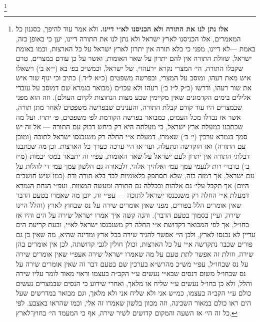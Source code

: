 \documentclass[12pt, openany]{book}
\newcommand{\footnotecomment}[1]{
	\renewcommand\thefootnote{}
	\footnote{\textsf{#1}}}
\newcommand{\commenta}[1]{\footnotecomment{#1}\hspace{0em}}
\begin{document}
\commenta{\textrm{\textbf{אלו נתן לנו את התורה ולא הכניסנו לא״י דיינו.}} ולא אמר עוד להיפך, כסגנון כל המאמרים, אלו הכניסנו לארץ ישראל ולא נתן לנו את התורה דיינו, יען כי באופן כזה, באמת —לא דיינו, מפני כי בלא תורה אין יתרון לארץ ישראל על כל הארצות, וכמו באומת ישראל, שזולת התורה אין להם יתרון על שאר האומות, ואשר על כן עודם במצרים, טרם שקבלו התורה, הי׳ המצרי נקרא ״רעהו״, של ישראל, וכמש״כ בפ׳ בא (י״א ב׳) וישאלו איש מאת רעהו, ומוסב על המצרי, ובפרשה משפטים (כ״א ל״ד.) כתיב וכי יגוף שור איש את שור רעהו, ודרשו (ב״ק ל״ז ב׳) רעהו ולא עכו״ם (מבואר בגמרא שם דמוסב על עובדי אלילים בימים הקדמונים שאין מקיימין שבע מצות הנחוצות לקיום העולם). וזה הוא מפני שבמצרים היו עוד קודם קבלת התורה, והענינים שבפרשה משפטים לאחר מתן תורה, אשר אז נבדלו מכל העמים, כמבואר בפרשה הקודמת לפ׳ משפטים, פ׳ יתרו. ועל מה שכתבנו במעלת ארץ ישראל, כי מעלתה היא רק ביחש דבוק עם התורה — אל זה יש סמך בגמרא ערכין (י׳ ב׳) שאמרו, דמעלת א״י החלה רק משנכנסו ישראל לתוכה (ומובן עם התורה) ואז הוקדשה ונתעלה, ועד אז הי׳ ערכה כערך כל הארצות. וכן מה שכתבנו דבלתי התורה אין יתרון לעם ישראל על שאר האומות, עפ״י זה יתבאר במס׳ יבמות (מ״ז ב׳) בדברי רות לנעמי עמך עמי ואלהיך אלהי, ולכאורה גם הלשון עמך עמי די להלות על עם ישראל, אך רמזה בזה, שלא תסתפק בלאומיות לבד בלא תורה ודת (כמו שיש חושבים היום) אך תקבל עלי׳ גם אלהות ובכללה גם התורה ומעשה המצוות. ועפ״י הנחת הגמרא דמעלת א״י החלה רק משנכנסו ישראל לתוכה — עפ״י זה, יובן מה שאמרו בטעם הדבר שאין אומרים הלל בפורים, מפני שאין אומרים שירה על נס שבחוץ לארץ (והלל היינו שירה, ועיין בסמוך בטעם הדבר). והנה קשה איך אמרו ישראל שירה על הים והיו אז בחו״ל, אך לפי המבואר דקדושת א״י החלה רק משנכנסו ישראל לא״י, ובעת קריעת הים עדיין לא נכנסו לארץ, ולכן הי׳ אפשר להגיד שירה בכל ארץ ומדינה שהיא, מה שאין כן גם פורים שכבר נתקדשה א״י על כל הארצות, וכולן חולין לגבי קדושתה, לכן אין אומרים בהן שירה. וזולת זה אפשר לתת טעם על מה שאמרו ישראל שירה אעפ״י שאין אומרים שירה על נס שבחו״ל, עפ״י מש״כ מהרש״א בערכין שם בטעם דבר זה שאין אומרים שירה על נס שבחו״ל משום דנסים שבא״י נעשים ע״י הקב״ה בעצמו וראוי מאוד לומר עליו שירה והלל, ולא כן בחו״ל נעשים ע״י שליח או מלאך, ואחרי שידוע כי הנסים שבמצרים נעשים כולם ע״י הקב״ה בעצמו, כמ״ש אני ולא שליח אני ולא מלאך, וגם מבואר במדרשים שעל הים ראו כולם במאור השכינה, וזה מכוון בלשון שאמרו זה אלי, וכמו שהראו באצבע. לפי כל זה הי׳ אז השעה והמקום קדושים לשיר שירה, אף כי המעמד הי׳ בחוץ־לארץ.}%
\end{document}
